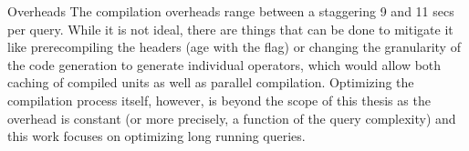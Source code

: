 \begin{corrected}{Overheads}
  The compilation overheads range between a staggering 9 and 11 secs
  per query. While it is not ideal, there are things that can be done
  to mitigate it like prerecompiling the headers (age with the
   flag) or changing the granularity of the code
  generation to generate individual operators, which would allow both
  caching of compiled units as well as parallel
  compilation. Optimizing the compilation process itself, however, is
  beyond the scope of this thesis as the overhead is constant (or more
  precisely, a function of the query complexity) and this work focuses
  on optimizing long running queries.
\end{corrected}

